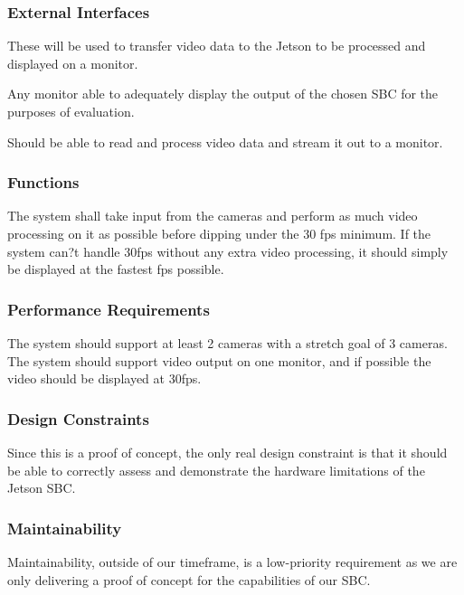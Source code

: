 \subsubsection{External Interfaces}
\begin{description}[leftmargin=2cm,labelindent=2cm]
	\item [Two 1080p Cameras] These will be used to transfer video data to the Jetson to be processed and displayed on a monitor.
	\item [Monitor] Any monitor able to adequately display the output of the chosen SBC for the purposes of evaluation. 
	\item [Jetson] Should be able to read and process video data and stream it out to a monitor.\\
\end{description}

\subsubsection{Functions}
The system shall take input from the cameras and perform as much video processing on it as possible before dipping under the 30 fps minimum.
If the system can?t handle 30fps without any extra video processing, it should simply be displayed at the fastest fps possible.\\

\subsubsection{Performance Requirements}
The system should support at least 2 cameras with a stretch goal of 3 cameras.
The system should support video output on one monitor, and if possible the video should be displayed at 30fps.\\

\subsubsection{Design Constraints}
Since this is a proof of concept, the only real design constraint is that it should be able to correctly assess and demonstrate the hardware limitations of the Jetson SBC.\\

\subsubsection{Maintainability}
Maintainability, outside of our timeframe, is a low-priority requirement as we are only delivering a proof of concept for the capabilities of our SBC.\\

